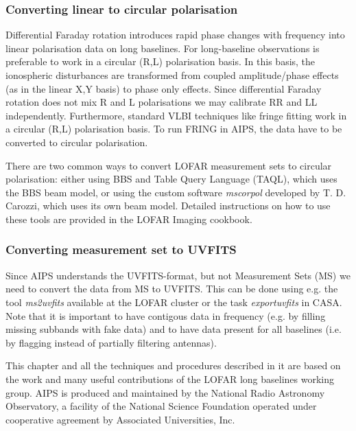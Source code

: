 \documentclass[graybox]{svmult}
\begin{document}
\subsubsection{Converting linear to circular polarisation}

Differential Faraday rotation introduces rapid phase changes with frequency
into linear polarisation data on long baselines. For long-baseline observations
is preferable to work in a circular (R,L) polarisation basis. In this basis,
the ionospheric disturbances are transformed from coupled amplitude/phase
effects (as in the linear X,Y basis) to phase only effects. Since differential
Faraday rotation does not mix R and L polarisations we may calibrate RR and LL
independently. Furthermore, standard VLBI techniques like fringe fitting work
in a circular (R,L) polarisation basis. To run FRING in AIPS, the data have to be
converted to circular polarisation.

There are two common ways to convert LOFAR measurement sets to circular polarisation:
either using BBS and Table Query Language (TAQL), which uses the BBS beam model,
or using the custom software \emph{mscorpol} developed by T. D. Carozzi, which uses
its own beam model. Detailed instructions on how to use these tools are provided in the LOFAR Imaging cookbook.

\subsubsection{Converting measurement set to UVFITS}
Since AIPS understands the UVFITS-format, but not Measurement Sets (MS)
we need to convert the data from MS to UVFITS. This can be done using e.g.
the tool \emph{ms2uvfits} available at the LOFAR cluster or the task \emph{exportuvfits} in CASA.
Note that it is important to have contigous data in frequency (e.g. by filling 
missing subbands with fake data) and to have data present for all baselines (i.e.
by flagging instead of partially filtering antennas). 



\begin{acknowledgement}
This chapter and all the techniques and procedures described in it are based on
the work and many useful contributions of the LOFAR long baselines working
group. AIPS is produced and maintained by the National Radio Astronomy
Observatory, a facility of the National Science Foundation operated under
cooperative agreement by Associated Universities, Inc.

\end{acknowledgement}

%



\end{document}
